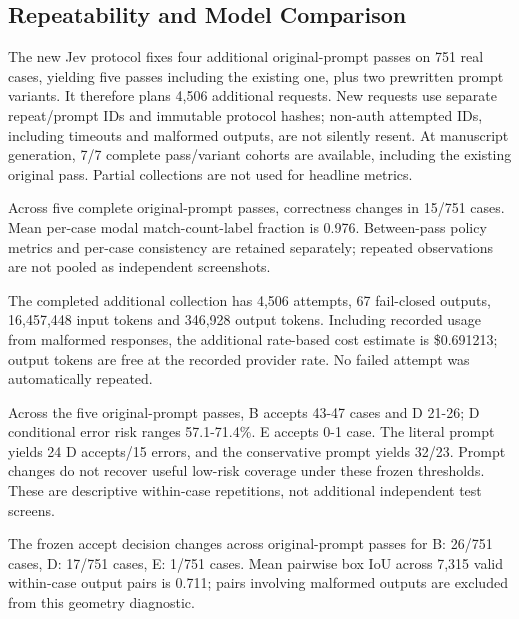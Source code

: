 \documentclass[10pt]{article}
\begin{document}
\subsection{Repeatability and Model Comparison}
The new Jev protocol fixes four additional original-prompt passes on 751 real cases, yielding five passes including the existing one, plus two prewritten prompt variants. It therefore plans 4,506 additional requests. New requests use separate repeat/prompt IDs and immutable protocol hashes; non-auth attempted IDs, including timeouts and malformed outputs, are not silently resent. At manuscript generation, 7/7 complete pass/variant cohorts are available, including the existing original pass. Partial collections are not used for headline metrics.

Across five complete original-prompt passes, correctness changes in 15/751 cases. Mean per-case modal match-count-label fraction is 0.976. Between-pass policy metrics and per-case consistency are retained separately; repeated observations are not pooled as independent screenshots.

The completed additional collection has 4,506 attempts, 67 fail-closed outputs, 16,457,448 input tokens and 346,928 output tokens. Including recorded usage from malformed responses, the additional rate-based cost estimate is \$0.691213; output tokens are free at the recorded provider rate. No failed attempt was automatically repeated.

Across the five original-prompt passes, B accepts 43-47 cases and D 21-26; D conditional error risk ranges 57.1-71.4\%. E accepts 0-1 case. The literal prompt yields 24 D accepts/15 errors, and the conservative prompt yields 32/23. Prompt changes do not recover useful low-risk coverage under these frozen thresholds. These are descriptive within-case repetitions, not additional independent test screens.

The frozen accept decision changes across original-prompt passes for B: 26/751 cases, D: 17/751 cases, E: 1/751 cases. Mean pairwise box IoU across 7,315 valid within-case output pairs is 0.711; pairs involving malformed outputs are excluded from this geometry diagnostic.
\end{document}

